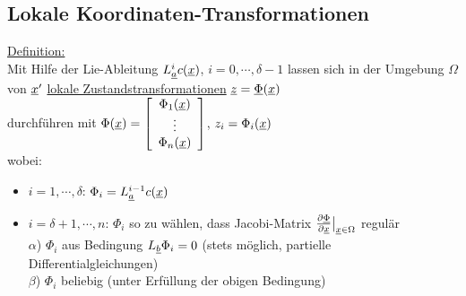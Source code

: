 \documentclass[openany,a4paper,11pt]{book}
\begin{document}
\subsection{Lokale Koordinaten-Transformationen} 
\uline{Definition:} \\
Mit Hilfe der Lie-Ableitung $L_{\uline{a}}^ic(\uline{x})$, $i=0,\cdots ,\delta-1$ lassen sich in der Umgebung $\Omega$ von $\uline{x}'$ \uline{lokale Zustandstransformationen} $\uline{z}=\uline{\Phi}(\uline{x})$ \\
durchführen mit $\Phi(\uline{x})=\left[ \begin{array}{c} \Phi_1(\uline{x})\\ \vdots\\ \Phi_n(\uline{x})\\ \end{array} \right]$, $z_i=\Phi_i(\uline{x})$\\
wobei: \begin{itemize}
    \item $i=1,\cdots,\delta$: $\Phi_i=L_{\uline{a}}^{i-1}c(\uline{x})$
    \item $i=\delta+1,\cdots,n$: $\Phi_i$ so zu wählen, dass Jacobi-Matrix $\frac{\partial \uline{\Phi}}{\partial \uline{x}}\big|_{\uline{x} \in \Omega}$ regulär\\
    $\alpha$) $\Phi_i$ aus Bedingung $L_{\uline{b}}\Phi_i=0$ (stets möglich, partielle Differentialgleichungen)\\
    $\beta$) $\Phi_i$ beliebig (unter Erfüllung der obigen Bedingung)
\end{itemize}
\end{document}
